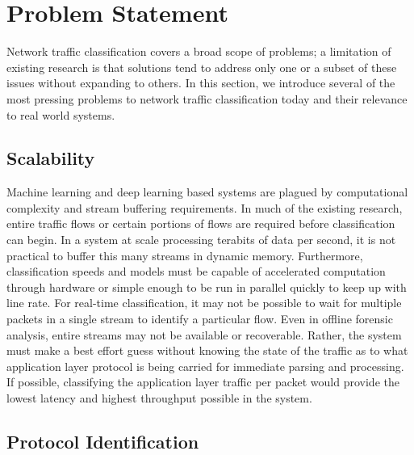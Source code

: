 \section{Problem Statement}
Network traffic classification covers a broad scope of problems; a limitation of existing research is that solutions tend to address only one or a subset of these issues without expanding to others. In this section, we introduce several of the most pressing problems to network traffic classification today and their relevance to real world systems.

\subsection{Scalability}

Machine learning and deep learning based systems are plagued by computational complexity and stream buffering requirements. In much of the existing research, entire traffic flows or certain portions of flows are required before classification can begin. In a system at scale processing terabits of data per second, it is not practical to buffer this many streams in dynamic memory. Furthermore, classification speeds and models must be capable of accelerated computation through hardware or simple enough to be run in parallel quickly to keep up with line rate. For real-time classification, it may not be possible to wait for multiple packets in a single stream to identify a particular flow. Even in offline forensic analysis, entire streams may not be available or recoverable. Rather, the system must make a best effort guess without knowing the state of the traffic as to what application layer protocol is being carried for immediate parsing and processing. If possible, classifying the application layer traffic per packet would provide the lowest latency and highest throughput possible in the system.

\subsection{Protocol Identification}

